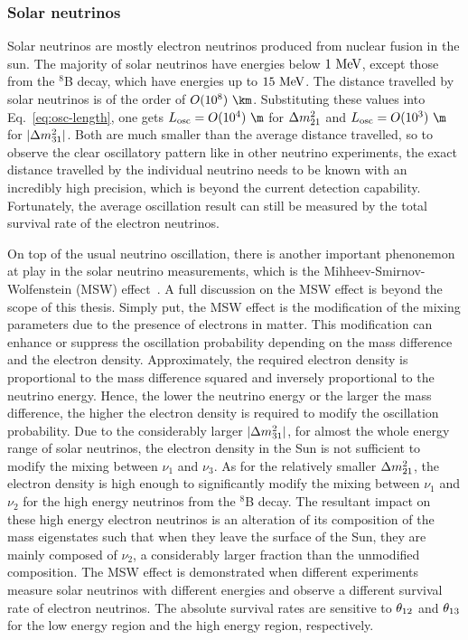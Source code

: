   \subsubsection{Solar neutrinos}
  Solar neutrinos are mostly electron neutrinos produced from nuclear fusion in the sun.
  The majority of solar neutrinos have energies below $1~\textrm{MeV}$, except those from the $^8$B decay, which have energies up to $15~\textrm{MeV}$.
  The distance travelled by solar neutrinos is of the order of $O(10^8)~\km$.
  Substituting these values into Eq.~\ref{eq:osc-length}, one gets $L_{\text{osc}} = O(10^4)~\m$ for $\Delta m^2_{21}$ and $L_{\text{osc}} = O(10^3)~\m$ for $|\Delta m^2_{31}|$.
  Both are much smaller than the average distance travelled, so to observe the clear oscillatory pattern like in other neutrino experiments, the exact distance travelled by the individual neutrino needs to be known with an incredibly high precision, which is beyond the current detection capability.
  Fortunately, the average oscillation result can still be measured by the total survival rate of the electron neutrinos.
  
  On top of the usual neutrino oscillation, there is another important phenonemon at play in the solar neutrino measurements, which is the Mihheev-Smirnov-Wolfenstein (MSW) effect~\cite{Wolfenstein:1977ue,Mikheyev:1985zog}.
  A full discussion on the MSW effect is beyond the scope of this thesis.
  Simply put, the MSW effect is the modification of the mixing parameters due to the presence of electrons in matter. 
  This modification can enhance or suppress the oscillation probability depending on the mass difference and the electron density.
  Approximately, the required electron density is proportional to the mass difference squared and inversely proportional to the neutrino energy.
  Hence, the lower the neutrino energy or the larger the mass difference, the higher the electron density is required to modify the oscillation probability.
  Due to the considerably larger $|\Delta m^2_{31}|$, for almost the whole energy range of solar neutrinos, the electron density in the Sun is not sufficient to modify the mixing between $\nu_1$ and $\nu_3$.
  As for the relatively smaller $\Delta m^2_{21}$, the electron density is high enough to significantly modify the mixing between $\nu_1$ and $\nu_2$ for the high energy neutrinos from the $^8$B decay.
  The resultant impact on these high energy electron neutrinos is an alteration of its composition of the mass eigenstates such that when they leave the surface of the Sun, they are mainly composed of $\nu_2$, a considerably larger fraction than the unmodified composition.
  The MSW effect is demonstrated when different experiments measure solar neutrinos with different energies and observe a different survival rate of electron neutrinos.
  The absolute survival rates are sensitive to $\theta_{12}$ and $\theta_{13}$ for the low energy region and the high energy region, respectively.


